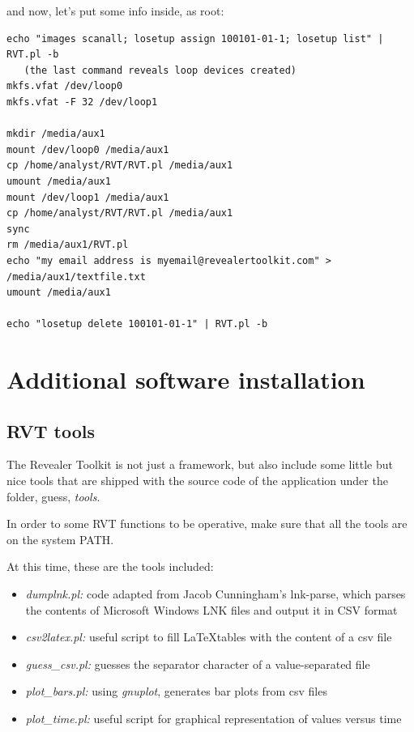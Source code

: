 \documentclass[a4paper,11pt,oneside]{report}
\begin{document}
and now, let's put some info inside, as root:

\begin{verbatim}
echo "images scanall; losetup assign 100101-01-1; losetup list" | RVT.pl -b
   (the last command reveals loop devices created)
mkfs.vfat /dev/loop0
mkfs.vfat -F 32 /dev/loop1   

mkdir /media/aux1
mount /dev/loop0 /media/aux1
cp /home/analyst/RVT/RVT.pl /media/aux1
umount /media/aux1
mount /dev/loop1 /media/aux1
cp /home/analyst/RVT/RVT.pl /media/aux1
sync
rm /media/aux1/RVT.pl
echo "my email address is myemail@revealertoolkit.com" > /media/aux1/textfile.txt
umount /media/aux1

echo "losetup delete 100101-01-1" | RVT.pl -b
\end{verbatim}




\chapter{Additional software installation}

\section{RVT tools} \label{anx:rvttools}

The Revealer Toolkit is not just a framework, but also include some little but nice tools that are shipped with the source code of the application under the folder, guess, \emph{tools}. 

In order to some RVT functions to be operative, make sure that all the tools are on the system PATH.

At this time, these are the tools included:

\begin{itemize}
\item \emph{dumplnk.pl:} code adapted from Jacob Cunningham's lnk-parse, which parses the contents of Microsoft Windows LNK files and output it in CSV format
\item \emph{csv2latex.pl:} useful script to fill \LaTeX tables with the content of a csv file
\item \emph{guess_csv.pl:} guesses the separator character of a value-separated file
\item \emph{plot_bars.pl:} using \emph{gnuplot}, generates bar plots from csv files
\item \emph{plot_time.pl:} useful script for graphical representation of values versus time
\end{itemize}
\end{document}
